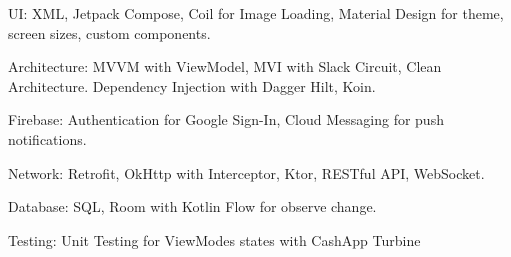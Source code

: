 \begin{cvparagraph}

UI: XML, Jetpack Compose, Coil for Image Loading, Material Design for theme, screen sizes, custom components.

Architecture: MVVM with ViewModel, MVI with Slack Circuit, Clean Architecture. Dependency Injection with Dagger Hilt, Koin.

Firebase: Authentication for Google Sign-In, Cloud Messaging for push notifications.

Network: Retrofit, OkHttp with Interceptor, Ktor, RESTful API, WebSocket.

Database: SQL, Room with Kotlin Flow for observe change.

Testing: Unit Testing for ViewModes states with CashApp Turbine

\end{cvparagraph}
